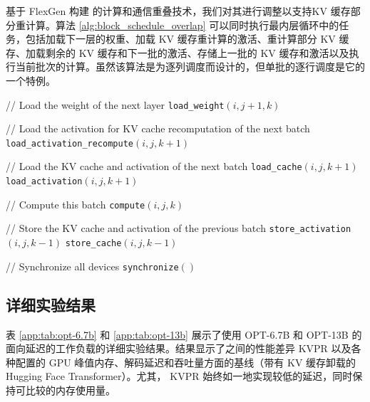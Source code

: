 \documentclass[11pt]{article}
\newcommand{\paperName}{KVPR}
\begin{document}
基于 FlexGen 构建 \cite{sheng2023flexgen}的计算和通信重叠技术，我们对其进行调整以支持KV 缓存部分重计算。算法 \ref{alg:block_schedule_overlap} 可以同时执行最内层循环中的任务，包括加载下一层的权重、加载 KV 缓存重计算的激活、重计算部分 KV 缓存、加载剩余的 KV 缓存和下一批的激活、存储上一批的 KV 缓存和激活以及执行当前批次的计算。虽然该算法是为逐列调度而设计的，但单批的逐行调度是它的一个特例。


\begin{algorithm}[t!]
\caption{带重叠的 KV 缓存部分重计算}
\label{alg:block_schedule_overlap}
\begin{algorithmic} %
            \STATE // Load the weight of the next layer
            \STATE \texttt{load\_weight}$(i, j+1, k)$
            
            \STATE // Load the activation for KV cache recomputation of the next batch
            \STATE \texttt{load\_activation\_recompute}$(i, j, k+1)$
            
            \STATE // Load the KV cache and activation of the next batch
            \STATE \texttt{load\_cache}$(i, j, k+1)$
            \STATE \texttt{load\_activation}$(i, j, k+1)$
            
            \STATE // Compute this batch
            \STATE \texttt{compute}$(i, j, k)$
            
            \STATE // Store the KV cache and activation of the previous batch
            \STATE \texttt{store\_activation}$(i, j, k-1)$
            \STATE \texttt{store\_cache}$(i, j, k-1)$
            
            \STATE // Synchronize all devices
            \STATE \texttt{synchronize}$()$
        \ENDFOR
    \ENDFOR
\ENDFOR
\end{algorithmic}
\end{algorithm}


\subsection{详细实验结果}
\label{app:detailed-exp}
表 \ref{app:tab:opt-6.7b} 和 \ref{app:tab:opt-13b} 展示了使用 OPT-6.7B 和 OPT-13B 的面向延迟的工作负载的详细实验结果。结果显示了之间的性能差异 {\paperName} 以及各种配置的 GPU 峰值内存、解码延迟和吞吐量方面的基线（带有 KV 缓存卸载的 Hugging Face Transformer）。尤其， {\paperName} 始终如一地实现较低的延迟，同时保持可比较的内存使用量。
\end{document}
